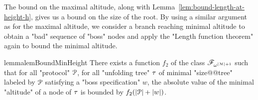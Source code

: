 The bound on the maximal altitude, along with Lemma~\ref{lem:bound-length-at-height-h}, gives us a bound on the size of the root. 
By using a similar argument as for the maximal altitude, we consider a branch reaching minimal altitude to obtain a "bad" sequence of "boss" nodes and apply the "Length function theorem" again to bound the minimal altitude.



\begin{restatable}{lemma}{lemBoundMinHeight}
	\label{lem:bound-min-height}
	There exists a function $f_2$ of the class $\mathscr{F}_{\omega^{|\mathcal{M}|+1}}$ such that for all "protocol" $\mathcal{P}$, for all "unfolding tree" $\tau$ of minimal "size@@tree" labeled by $\mathcal{P}$ satisfying a "boss specification" $w$, the absolute value of the minimal "altitude" of a node of $\tau$ is bounded by $f_2(|\mathcal{P}| + |w|)$.
\end{restatable}

